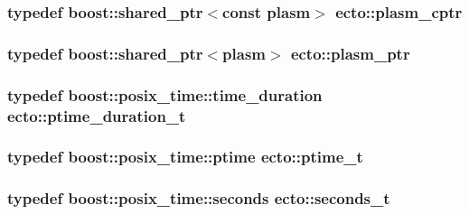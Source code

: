 \subsubsection[{\texorpdfstring{plasm\+\_\+cptr}{plasm_cptr}}]{\setlength{\rightskip}{0pt plus 5cm}typedef boost\+::shared\+\_\+ptr$<$const {\bf plasm}$>$ {\bf ecto\+::plasm\+\_\+cptr}}\hypertarget{namespaceecto_a5a9973f00c94e30353acb27c3d2fa836}{}\label{namespaceecto_a5a9973f00c94e30353acb27c3d2fa836}
\subsubsection[{\texorpdfstring{plasm\+\_\+ptr}{plasm_ptr}}]{\setlength{\rightskip}{0pt plus 5cm}typedef boost\+::shared\+\_\+ptr$<${\bf plasm}$>$ {\bf ecto\+::plasm\+\_\+ptr}}\hypertarget{namespaceecto_a6b83be6cd685db71f03b14871653475f}{}\label{namespaceecto_a6b83be6cd685db71f03b14871653475f}
\subsubsection[{\texorpdfstring{ptime\+\_\+duration\+\_\+t}{ptime_duration_t}}]{\setlength{\rightskip}{0pt plus 5cm}typedef boost\+::posix\+\_\+time\+::time\+\_\+duration {\bf ecto\+::ptime\+\_\+duration\+\_\+t}}\hypertarget{namespaceecto_a0952d5ebd059cbd79b978ecab9ec781c}{}\label{namespaceecto_a0952d5ebd059cbd79b978ecab9ec781c}
\subsubsection[{\texorpdfstring{ptime\+\_\+t}{ptime_t}}]{\setlength{\rightskip}{0pt plus 5cm}typedef boost\+::posix\+\_\+time\+::ptime {\bf ecto\+::ptime\+\_\+t}}\hypertarget{namespaceecto_a5bbe8fb0da047cb18d92eb9dfb469652}{}\label{namespaceecto_a5bbe8fb0da047cb18d92eb9dfb469652}
\subsubsection[{\texorpdfstring{seconds\+\_\+t}{seconds_t}}]{\setlength{\rightskip}{0pt plus 5cm}typedef boost\+::posix\+\_\+time\+::seconds {\bf ecto\+::seconds\+\_\+t}}\hypertarget{namespaceecto_ae14f91b3661ad9cb774590b15407742c}{}\label{namespaceecto_ae14f91b3661ad9cb774590b15407742c}
